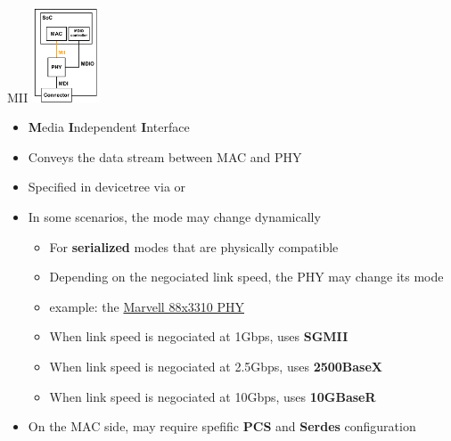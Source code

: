 \begin{frame}{MII}
	\hfill
	\includegraphics[width=0.15\textwidth]{slides/networking-driver-phy/mii.pdf}
	\vspace{-3cm}
	\begin{itemize}
		\item \textbf{M}edia \textbf{I}ndependent \textbf{I}nterface
		\item Conveys the data stream between MAC and PHY
		\item Specified in devicetree via  or 
		\item In some scenarios, the mode may change dynamically
			\begin{itemize}
				\item For \textbf{serialized} modes that are physically compatible
				\item Depending on the negociated link speed, the PHY may change its mode
				\item example: the \href{https://elixir.bootlin.com/linux/v6.15.1/source/drivers/net/phy/marvell10g.c}{Marvell 88x3310 PHY}
				\item When link speed is negociated at 1Gbps, uses \textbf{SGMII}
				\item When link speed is negociated at 2.5Gbps, uses \textbf{2500BaseX}
				\item When link speed is negociated at 10Gbps, uses \textbf{10GBaseR}
			\end{itemize}
		\item On the MAC side, may require spefific \textbf{PCS} and \textbf{Serdes} configuration
	\end{itemize}
\end{frame}

